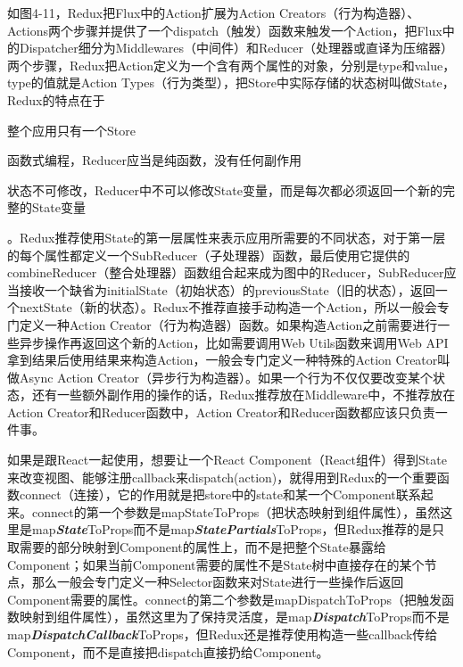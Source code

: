 如图4-11，Redux把Flux中的Action扩展为Action Creators（行为构造器）、Actions两个步骤并提供了一个dispatch（触发）函数来触发一个Action，把Flux中的Dispatcher细分为Middlewares（中间件）和Reducer（处理器或直译为压缩器）两个步骤，Redux把Action定义为一个含有两个属性的对象，分别是type和value，type的值就是Action Types（行为类型），把Store中实际存储的状态树叫做State，Redux的特点在于
\begin{enumerate*}
  \item 整个应用只有一个Store
  \item 函数式编程，Reducer应当是纯函数，没有任何副作用
  \item 状态不可修改，Reducer中不可以修改State变量，而是每次都必须返回一个新的完整的State变量
\end{enumerate*}。Redux推荐使用State的第一层属性来表示应用所需要的不同状态，对于第一层的每个属性都定义一个SubReducer（子处理器）函数，最后使用它提供的combineReducer（整合处理器）函数组合起来成为图中的Reducer，SubReducer应当接收一个缺省为initialState（初始状态）的previousState（旧的状态），返回一个nextState（新的状态）。Redux不推荐直接手动构造一个Action，所以一般会专门定义一种Action Creator（行为构造器）函数。如果构造Action之前需要进行一些异步操作再返回这个新的Action，比如需要调用Web Utils函数来调用Web API拿到结果后使用结果来构造Action，一般会专门定义一种特殊的Action Creator叫做Async Action Creator（异步行为构造器）。如果一个行为不仅仅要改变某个状态，还有一些额外副作用的操作的话，Redux推荐放在Middleware中，不推荐放在Action Creator和Reducer函数中，Action Creator和Reducer函数都应该只负责一件事。

如果是跟React一起使用，想要让一个React Component（React组件）得到State来改变视图、能够注册callback来dispatch(action)，就得用到Redux的一个重要函数connect（连接），它的作用就是把store中的state和某一个Component联系起来。connect的第一个参数是mapStateToProps（把状态映射到组件属性），虽然这里是map\emph{\textbf{State}}ToProps而不是map\emph{\textbf{StatePartials}}ToProps，但Redux推荐的是只取需要的部分映射到Component的属性上，而不是把整个State暴露给Component；如果当前Component需要的属性不是State树中直接存在的某个节点，那么一般会专门定义一种Selector函数来对State进行一些操作后返回Component需要的属性。connect的第二个参数是mapDispatchToProps（把触发函数映射到组件属性），虽然这里为了保持灵活度，是map\emph{\textbf{Dispatch}}ToProps而不是map\emph{\textbf{DispatchCallback}}ToProps，但Redux还是推荐使用构造一些callback传给Component，而不是直接把dispatch直接扔给Component。

